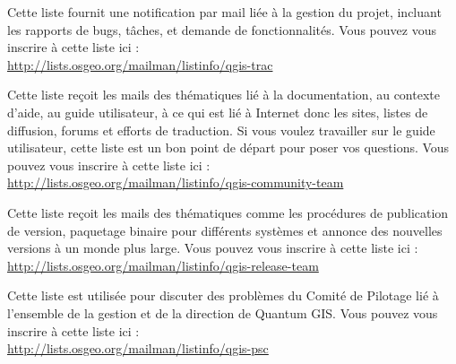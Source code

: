Cette liste fournit une notification par mail liée à la gestion du projet,
incluant les rapports de bugs, tâches, et demande de fonctionnalités. Vous
pouvez vous inscrire à cette liste ici :\\
\url{http://lists.osgeo.org/mailman/listinfo/qgis-trac}

Cette liste reçoit les mails des thématiques lié à la documentation, au
contexte d'aide, au guide utilisateur, à ce qui est lié à Internet donc les
sites, listes de diffusion, forums et efforts de traduction. Si vous voulez
travailler sur le guide utilisateur, cette liste est un bon point de départ
pour poser vos questions. Vous pouvez vous inscrire à cette liste ici :\\
\url{http://lists.osgeo.org/mailman/listinfo/qgis-community-team}

Cette liste reçoit les mails des thématiques comme les procédures de
publication de version, paquetage binaire pour différents systèmes et annonce
des nouvelles versions à un monde plus large. Vous pouvez vous inscrire à cette
liste ici :\\
\url{http://lists.osgeo.org/mailman/listinfo/qgis-release-team}

Cette liste est utilisée pour discuter des problèmes du Comité de Pilotage lié à
l'ensemble de la gestion et de la direction de Quantum GIS. Vous pouvez vous
inscrire à cette liste ici :\\
\url{http://lists.osgeo.org/mailman/listinfo/qgis-psc}

